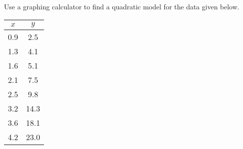 \begin{try}
Use a graphing calculator to find a quadratic model for the data given below.
\begin{center}
\begin{tabular}{c c}
$x$ & $y$\\
\hline
0.9 & 2.5\\
1.3 & 4.1\\
1.6 & 5.1\\
2.1 & 7.5\\
2.5 & 9.8\\
3.2 & 14.3\\
3.6 & 18.1\\
4.2 & 23.0
\end{tabular}
\end{center}
\end{try}
\pagebreak

